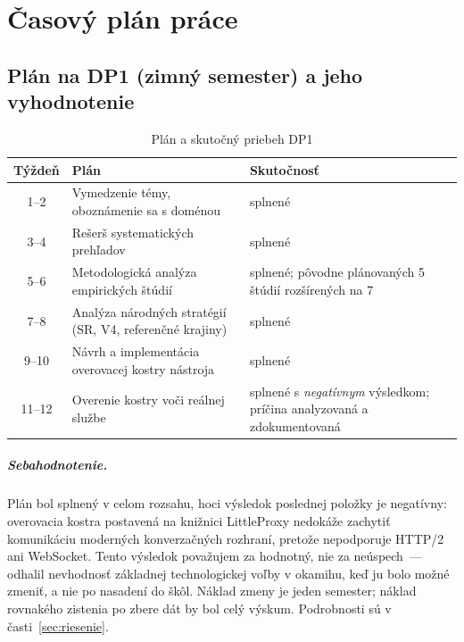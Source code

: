 \chapter{Časový plán práce}
\label{chapter:Work-Schedule}

\section{Plán na DP1 (zimný semester) a jeho vyhodnotenie}
\label{sec:Work-Schedule-1st-semester}

\begin{table}[H]
    \centering
    \caption{Plán a skutočný priebeh DP1}
    \label{tab:dp1}
    \small
    \begin{tabularx}{\textwidth}{@{}c X X@{}}
    \toprule
        \textbf{Týždeň} & \textbf{Plán} & \textbf{Skutočnosť} \\
    \midrule
        1--2   & Vymedzenie témy, oboznámenie sa s doménou & splnené \\
        3--4   & Rešerš systematických prehľadov & splnené \\
        5--6   & Metodologická analýza empirických štúdií & splnené; pôvodne plánovaných 5 štúdií rozšírených na 7 \\
        7--8   & Analýza národných stratégií (SR, V4, referenčné krajiny) & splnené \\
        9--10  & Návrh a implementácia overovacej kostry nástroja & splnené \\
        11--12 & Overenie kostry voči reálnej službe & splnené s \emph{negatívnym} výsledkom; príčina analyzovaná a zdokumentovaná \\
    \bottomrule
    \end{tabularx}
\end{table}

\paragraph{Sebahodnotenie.} Plán bol splnený v celom rozsahu, hoci výsledok poslednej položky je negatívny: overovacia kostra postavená na knižnici LittleProxy nedokáže zachytiť komunikáciu moderných konverzačných rozhraní, pretože nepodporuje HTTP/2 ani WebSocket. Tento výsledok považujem za hodnotný, nie za neúspech~--- odhalil nevhodnosť základnej technologickej voľby v okamihu, keď ju bolo možné zmeniť, a nie po nasadení do škôl. Náklad zmeny je jeden semester; náklad rovnakého zistenia po zbere dát by bol celý výskum. Podrobnosti sú v časti~\ref{sec:riesenie}.

